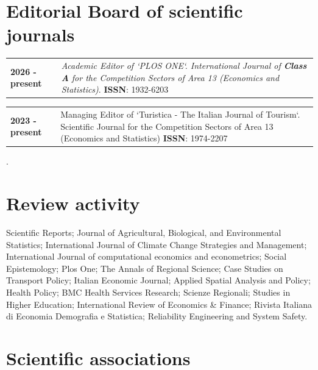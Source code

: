 \documentclass[11pt,a4paper,sans]{moderncv} %
\newcommand{\cvitemcols}[3]{%
  \begin{tabular}{p{#1}p{\dimexpr\linewidth-#1\relax}}
    \textbf{#2} & #3
  \end{tabular}\par\vspace{6pt}
}
\begin{document}


\section{\textbf{Editorial Board of scientific journals}}

\vspace{6pt}


\cvitemcols{3cm}{2026 - present}{\textit{Academic Editor of `PLOS ONE`. International Journal of \textbf{Class A} for the Competition Sectors of Area 13 (Economics and Statistics)}. \textbf{ISSN}: 1932-6203}

\vspace{6pt}

\cvitemcols{3cm}{2023 - present}{Managing Editor of `Turistica - The Italian Journal of Tourism`. Scientific Journal for the Competition Sectors of Area 13 (Economics and Statistics) \textbf{ISSN}: 1974-2207}. 







\section{\textbf{Review activity}}

\vspace{6pt}

Scientific Reports; Journal of Agricultural, Biological, and Environmental Statistics; International Journal of Climate Change Strategies and Management; International Journal of computational economics and econometrics; Social Epistemology; Plos One; The Annals of Regional Science; Case Studies on Transport Policy; Italian Economic Journal; Applied Spatial Analysis and Policy; Health Policy; BMC Health Services Research; Scienze Regionali; Studies in Higher Education; International Review of Economics \& Finance; Rivista Italiana di Economia Demografia e Statistica; Reliability Engineering and System Safety.





\section{\textbf{Scientific associations}}
\end{document}
